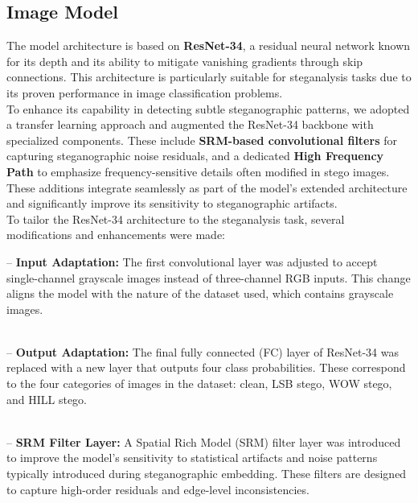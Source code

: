 \documentclass[12pt]{article}
\begin{document}
\subsection{Image Model}

\indent The model architecture is based on \textbf{ResNet-34}, a residual neural network known for its depth and its ability to mitigate vanishing gradients through skip connections. This architecture is particularly suitable for steganalysis tasks due to its proven performance in image classification problems. \vspace{0.3cm}\\
To enhance its capability in detecting subtle steganographic patterns, we adopted a transfer learning approach and augmented the ResNet-34 backbone with specialized components. These include  \textbf{SRM-based convolutional filters} for capturing steganographic noise residuals, and a dedicated \textbf{High Frequency Path} to emphasize frequency-sensitive details often modified in stego images. These additions integrate seamlessly as part of the model’s extended architecture and significantly improve its sensitivity to steganographic artifacts. \vspace{0.3cm} \\
To tailor the ResNet-34 architecture to the steganalysis task, several modifications and enhancements were made:

-- \textbf{Input Adaptation:} The first convolutional layer was adjusted to accept single-channel grayscale images instead of three-channel RGB inputs. This change aligns the model with the nature of the dataset used, which contains grayscale images. 

\vspace{0.05cm} \\

-- \textbf{Output Adaptation:} The final fully connected (FC) layer of ResNet-34 was replaced with a new layer that outputs four class probabilities. These correspond to the four categories of images in the dataset: clean, LSB stego, WOW stego, and HILL stego.


\vspace{0.05cm} \\ 

-- \textbf{SRM Filter Layer:} A Spatial Rich Model (SRM) filter layer was introduced to improve the model’s sensitivity to statistical artifacts and noise patterns typically introduced during steganographic embedding. These filters are designed to capture high-order residuals and edge-level inconsistencies.
\end{document}
